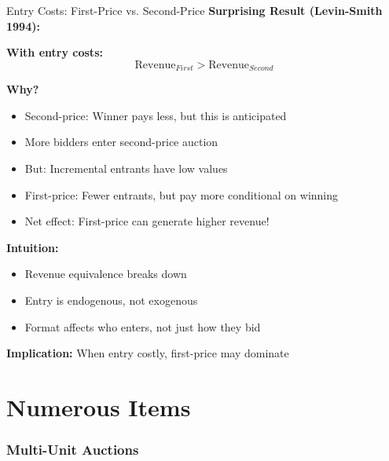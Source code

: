 \documentclass[xcolor={x11names}, aspectratio=169 ]{beamer}
\begin{document}
\begin{frame}{Entry Costs: First-Price vs. Second-Price}
\textbf{Surprising Result (Levin-Smith 1994):}

\textbf{With entry costs:}
$$\text{Revenue}_{First} > \text{Revenue}_{Second}$$

\textbf{Why?}
\begin{itemize}
  \item Second-price: Winner pays less, but this is anticipated
  \item More bidders enter second-price auction
  \item But: Incremental entrants have low values
  \item First-price: Fewer entrants, but pay more conditional on winning
  \item Net effect: First-price can generate higher revenue!
\end{itemize}

\textbf{Intuition:}
\begin{itemize}
  \item Revenue equivalence breaks down
  \item Entry is endogenous, not exogenous
  \item Format affects who enters, not just how they bid
\end{itemize}

\textbf{Implication:} When entry costly, first-price may dominate
\end{frame}

\part{Numerous Items}


\section{Multi-Unit Auctions}
\end{document}
